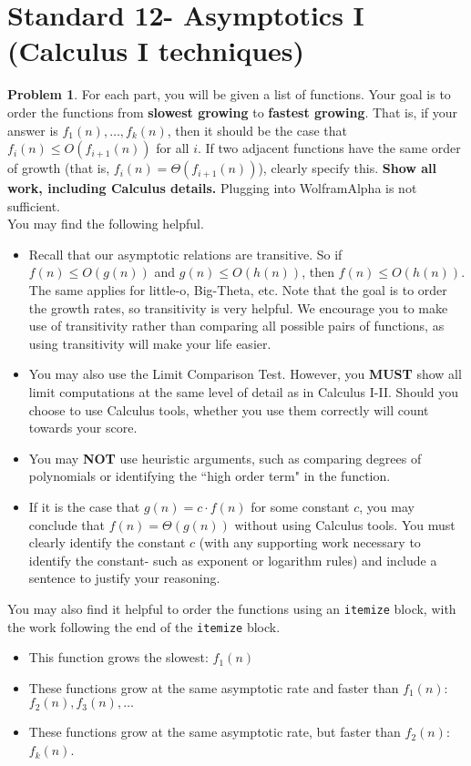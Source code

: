 \documentclass[11pt]{article}
\theoremstyle{definition}
\theoremstyle{definition}
\newtheorem{required}{Problem}
\theoremstyle{definition}
\begin{document}
\section{Standard 12- Asymptotics I (Calculus I techniques)}
\begin{required}
For each part, you will be given a list of functions. Your goal is to order the functions from \textbf{slowest growing} to \textbf{fastest growing}. That is, if your answer is $f_{1}(n), \ldots, f_{k}(n)$, then it should be the case that $f_{i}(n) \leq O(f_{i+1}(n))$ for all $i$. If two adjacent functions have the same order of growth (that is, $f_{i}(n) = \Theta(f_{i+1}(n))$), clearly specify this. \textbf{Show all work, including Calculus details.} Plugging into WolframAlpha is not sufficient. \\

\noindent You may find the following helpful.
\begin{itemize}
\item Recall that our asymptotic relations are transitive. So if $f(n) \leq O(g(n))$ and $g(n) \leq O(h(n))$, then $f(n) \leq O(h(n))$. The same applies for little-o, Big-Theta, etc. Note that the goal is to order the growth rates, so transitivity is very helpful. We encourage you to make use of transitivity rather than comparing all possible pairs of functions, as using transitivity will make your life easier.

\item You may also use the Limit Comparison Test. However, you \textbf{MUST} show all limit computations at the same level of detail as in Calculus I-II. Should you choose to use Calculus tools, whether you use them correctly will count towards your score.

\item You may \textbf{NOT} use heuristic arguments, such as comparing degrees of polynomials or identifying the ``high order term" in the function.

\item If it is the case that $g(n) = c \cdot f(n)$ for some constant $c$, you may conclude that $f(n) = \Theta(g(n))$ without using Calculus tools. You must clearly identify the constant $c$ (with any supporting work necessary to identify the constant- such as exponent or logarithm rules) and include a sentence to justify your reasoning. 
\end{itemize}


\noindent You may also find it helpful to order the functions using an \texttt{itemize} block, with the work following the end of the \texttt{itemize} block.
\begin{itemize}
\item This function grows the slowest: $f_{1}(n)$
\item These functions grow at the same asymptotic rate and faster than $f_{1}(n)$: $f_{2}(n), f_{3}(n), \ldots$
\item These functions grow at the same asymptotic rate, but faster than $f_{2}(n)$: $f_{k}(n)$.
\end{itemize}



\end{required}
\end{document}
